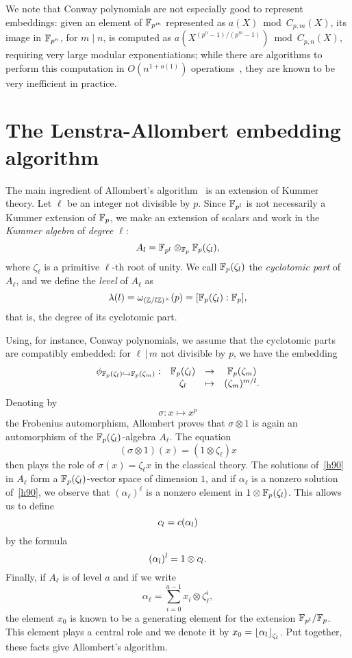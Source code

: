 \documentclass{sig-alternate}
\begin{document}
We note that Conway polynomials are not especially good to represent
embeddings: given an element of $\mathbb{F}_{p^m}$ represented as
$a(X) \bmod C_{p,m}(X)$, its image in $\mathbb{F}_{p^n}$, for $m\mid n$, is
computed as $a(X^{(p^n-1)/(p^m-1)})\bmod C_{p,n}(X)$, requiring very
large modular exponentiations; while there are algorithms to perform
this computation in $O(n^{1+o(1)})$ operations~\cite{KeUm11}, they are
known to be very inefficient in practice. %


\section{The Lenstra-Allombert embedding algorithm}
\label{sec:lenstra}
\cite{LenstraJr91}\cite{brieulle2018computing}


The main ingredient of Allombert's algorithm~\cite{Allombert02} is an extension
of Kummer theory.
Let $\ell$ be an integer not divisible by $p$.
Since $\mathbb{F}_{p^l}$ is not necessarily a Kummer
extension of $\mathbb{F}_p$, we make an extension of scalars and work in the
\emph{Kummer algebra} of \emph{degree} $\ell$:
\[
  A_l = \mathbb{F}_{p^l}\otimes_{\mathbb{F}_{p}}\mathbb{F}_{p}(\zeta_l),
\]
where $\zeta_\ell$ is a primitive $\ell$-th root of unity. We
call $\mathbb{F}_{p}(\zeta_l)$ the \emph{cyclotomic part} of $A_\ell$, and
we define the \emph{level} of $A_\ell$ as
\[
  \lambda(l) = \omega_{(\mathbb{Z}/l\mathbb{Z})^\times}(p) = [\mathbb{F}_{p}(\zeta_l):\mathbb{F}_{p}],
\]
that is, the degree of its cyclotomic part.

Using, for instance,
Conway polynomials, we assume that the cyclotomic parts are compatibly embedded:
for $\ell\,|\,m$ not divisible by $p$, we have the embedding
\[
\begin{array}{cccc}
  \phi_{\mathbb{F}_{p}(\zeta_{l})\hookrightarrow\mathbb{F}_{p}(\zeta_{m})}: & \mathbb{F}_{p}(\zeta_l) & \to & \mathbb{F}_{p}(\zeta_m) \\
  & \zeta_l & \mapsto & (\zeta_{m})^{m/l}.
\end{array}
\]
Denoting by \[ \sigma:x\mapsto x^p \]
the Frobenius automorphism, Allombert proves that
$\sigma\otimes1$ is again an automorphism of the
$\mathbb{F}_{p}(\zeta_l)$-algebra $A_\ell$. The equation
\begin{equation}
  \tag{H90}
 (\sigma\otimes1)(x) = (1\otimes\zeta_\ell)x
  \label{h90}
\end{equation}
then plays the role of $\sigma(x)=\zeta_\ell x$ in the classical theory. The
solutions of~\eqref{h90} in $A_\ell$ form a
$\mathbb{F}_{p}(\zeta_{l})$-vector space of dimension $1$, and if $\alpha_\ell$ is a
nonzero solution of~\eqref{h90}, we observe that $(\alpha_\ell)^\ell$ is a nonzero
element in $1\otimes\mathbb{F}_{p}(\zeta_l)$.
This allows us to define \[ c_l =c(\alpha_l) \]
by the formula
\[ (\alpha_l)^l = 1\otimes c_l. \]
Finally, if $A_\ell$ is of level $a$ and if we write
\[
  \alpha_\ell = \sum_{i =  0}^{a-1}x_i\otimes\zeta_{\ell}^i,
\]
the element $x_0$ is known to be a generating element for the extension
$\mathbb{F}_{p^l}/\mathbb{F}_{p}$. This element plays a central role and we
denote it by $x_0=\left\lfloor \alpha_l \right\rfloor_{\zeta_l}$. Put together, these facts give Allombert's
algorithm.
\end{document}
